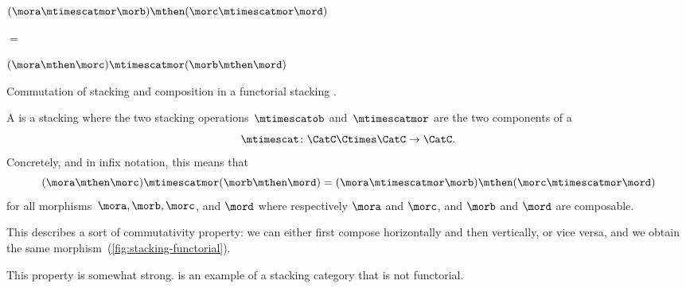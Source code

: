 \begin{marginfigure}
    \centering
    $(\mora \mtimescatmor \morb )
        \mthen (\morc \mtimescatmor \mord )$

    \vspace{3mm}

    $=$

    \vspace{3mm}
    \vspace{3mm}
    $(\mora \mthen \morc ) \mtimescatmor (\morb \mthen \mord )$

    \caption{Commutation of stacking and composition in a functorial stacking . }
    \label{fig:stacking-functorial}
\end{marginfigure}

\begin{ctdefinition}
    \label{def:functorial-stacking-semi-cat}
    A  is a stacking  where the two stacking operations~$\mtimescatob$ and~$\mtimescatmor$ are the two components of a  \begin{equation}
        \mtimescat\colon \CatC \Ctimes \CatC \to \CatC.
    \end{equation}
    Concretely, and in infix notation, this means that
    \begin{equation}
        (\mora \mthen \morc )
        \mtimescatmor (\morb \mthen \mord )
        =
        (\mora \mtimescatmor \morb )
        \mthen (\morc \mtimescatmor \mord )
    \end{equation}
    for all morphisms~$\mora, \morb, \morc$, and $\mord$ where respectively $\mora$ and $\morc$, and $\morb$ and $\mord$ are composable.
\end{ctdefinition}

%
This describes a sort of commutativity property: we can either first compose horizontally and then vertically, or vice versa, and we obtain the same morphism~(\cref{fig:stacking-functorial}).

This property is somewhat strong.
\Effects is an example of a stacking category that is not functorial.

